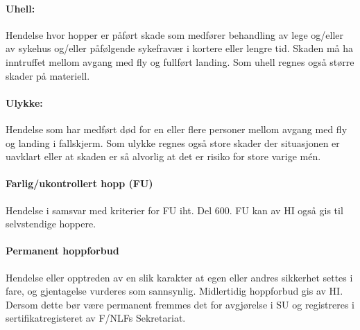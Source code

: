 \paragraph{Uhell:}
Hendelse hvor hopper er påført skade som medfører behandling av lege og/eller av sykehus og/eller påfølgende sykefravær i kortere eller lengre tid. Skaden må ha inntruffet mellom avgang med fly og fullført landing. Som uhell regnes også større skader på materiell.

\paragraph{Ulykke:}
Hendelse som har medført død for en eller flere personer mellom avgang med fly og landing i fallskjerm. Som ulykke regnes også store skader der situasjonen er uavklart eller at skaden er så alvorlig at det er risiko for store varige mén.

\paragraph{Farlig/ukontrollert hopp (FU)}
Hendelse i samsvar med kriterier for FU iht. Del 600. FU kan av HI også gis til selvstendige hoppere.

\paragraph{Permanent hoppforbud}
Hendelse eller opptreden av en slik karakter at egen eller andres sikkerhet settes i fare, og gjentagelse vurderes som sannsynlig. Midlertidig hoppforbud gis av HI. Dersom dette bør være permanent fremmes det for avgjørelse i SU og registreres i sertifikatregisteret av F/NLFs Sekretariat.
